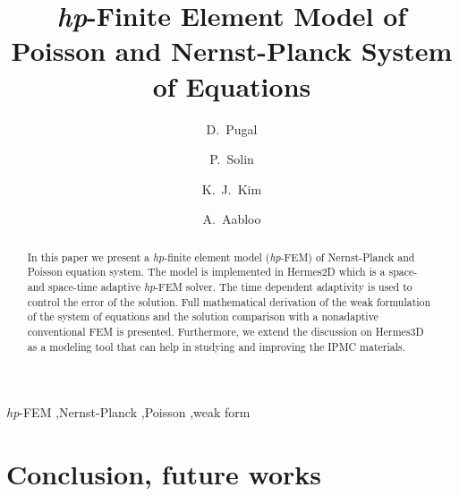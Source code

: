 \documentclass[letterpaper,3p]{elsarticle}
\begin{document}
\begin{frontmatter}

\title{\emph{hp}-Finite Element Model of Poisson and Nernst-Planck System of Equations}

\author[unrme,tartu]{D.~Pugal}

\author[unrmath,czech]{P.~Solin}

\author[unrme]{K.~J.~Kim}

\author[tartu]{A.~Aabloo}

\address[unrme]{Mechanical Engineering Department, University of Nevada, Reno, NV, U.S.A.}
\address[unrmath]{FEM group, Department of Mathematics and Statistics,\\
University of Nevada, Reno, NV, U.S.A.}
\address[czech]{Institute of Thermomechanics, Prague, Czech Republic}
\address[tartu]{Institute of Technology, Tartu University, Estonia}


\begin{abstract}
 In this paper we present a \emph{hp}-finite element
model (\emph{hp}-FEM) of Nernst-Planck and Poisson equation system.
The model is implemented in Hermes2D which is a
space- and space-time adaptive \emph{hp}-FEM solver. The time dependent
adaptivity is used to control the error of the solution. Full mathematical
derivation of the weak formulation of the system of equations and
the solution comparison with a nonadaptive conventional FEM is presented.
Furthermore, we extend the discussion on Hermes3D as a modeling tool that can
help in studying and improving the IPMC materials.
\end{abstract}

\begin{keyword}
  \emph{hp}-FEM \sep Nernst-Planck \sep Poisson \sep weak form
\end{keyword}

\end{frontmatter}






\section{Conclusion, future works}



\end{document}

